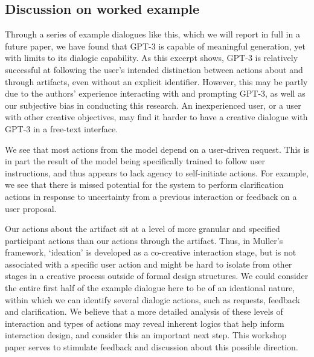 \documentclass[acmlarge, nonacm, screen]{acmart} %
\begin{document}
\subsection{Discussion on worked example}

Through a series of example dialogues like this, which we will report in full in a future paper, we have found that GPT-3 is capable of meaningful generation, yet with limits to its dialogic capability. As this excerpt shows, GPT-3 is relatively successful at following the user's intended distinction between actions about and through artifacts, even without an explicit identifier. However, this may be partly due to the authors' experience interacting with and prompting GPT-3, as well as our subjective bias in conducting this research. An inexperienced user, or a user with other creative objectives, may find it harder to have a creative dialogue with GPT-3 in a free-text interface. 

We see that most actions from the model depend on a user-driven request. This is in part the result of the model being specifically trained to follow user instructions, and thus appears to lack agency to self-initiate actions. For example, we see that there is missed potential for the system to perform clarification actions in response to uncertainty from a previous interaction or feedback on a user proposal.

Our actions about the artifact sit at a level of more granular and specified participant actions than our actions through the artifact. Thus, in Muller's \cite{mullermixed} framework, `ideation' is developed as a co-creative interaction stage, but is not associated with a specific user action and might be hard to isolate from other stages in a creative process outside of formal design structures. We could consider the entire first half of the example dialogue here to be of an ideational nature, within which we can identify several dialogic actions, such as requests, feedback and clarification. We believe that a more detailed analysis of these levels of interaction and types of actions may reveal inherent logics that help inform interaction design, and consider this an important next step. This workshop paper serves to stimulate feedback and discussion about this possible direction.
\end{document}

